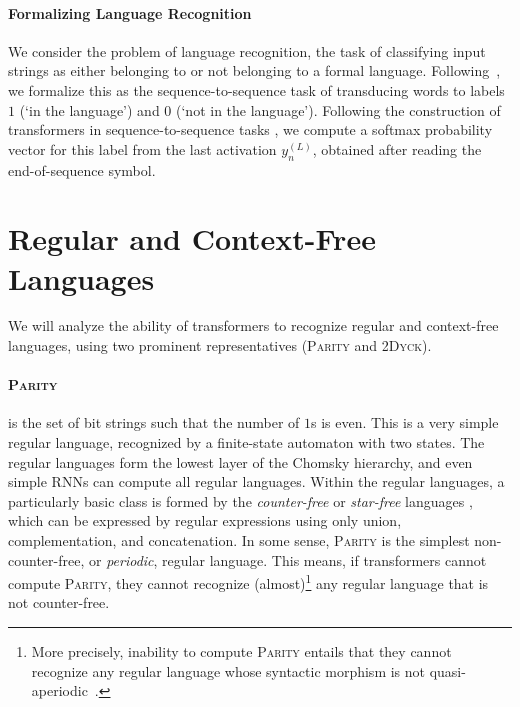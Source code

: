 \documentclass[11pt,a4paper]{article}
\begin{document}
\paragraph{Formalizing Language Recognition}
We consider the problem of language recognition, the task of classifying input strings as either belonging to or not belonging to a formal language.
Following~\citet{weiss2018practical}, we formalize this as the sequence-to-sequence task of transducing words to labels $1$ (`in the language') and $0$ (`not in the language').
Following the construction of transformers in sequence-to-sequence tasks \cite{vaswani2017attention}, we compute a softmax probability vector for this label from the last activation $y_{n}^{(L)}$, obtained after reading the end-of-sequence symbol.







\section{Regular and Context-Free Languages}\label{sec:langs} %

We will analyze the ability of transformers to recognize regular and context-free languages, using two prominent representatives (\textsc{Parity} and \textsc{2Dyck}). %


\paragraph{\textsc{Parity}} is the set of bit strings such that the number of $1$s is even.
This is a very simple regular language, recognized by a finite-state automaton with two states.
The regular languages form the lowest layer of the Chomsky hierarchy, and even simple RNNs can compute all regular languages.
Within the regular languages, a particularly basic class is formed by the \emph{counter-free} or \emph{star-free} languages \cite{mcnaughton1971counter}, which can be expressed by regular expressions using only union, complementation, and concatenation.
In some sense, \textsc{Parity} is the simplest non-counter-free, or \emph{periodic}, regular language.
This means, if transformers cannot compute \textsc{Parity}, they cannot recognize (almost)\footnote{More precisely, inability to compute \textsc{Parity} entails that they cannot recognize any regular language whose syntactic morphism is not quasi-aperiodic~\cite[p. 488]{barrington1992regular}.} any regular language that is not counter-free.
\end{document}
